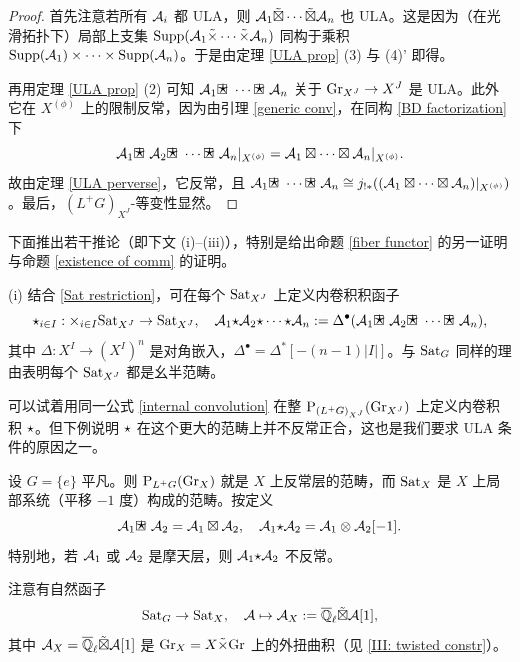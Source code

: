 \begin{proof}
首先注意若所有 ${\mathcal A}_i$ 都 ULA，则 ${\mathcal A}_1\tilde\boxtimes\cdots\tilde\boxtimes{\mathcal A}_n$ 也 ULA。这是因为（在光滑拓扑下）局部上支集 $\operatorname{Supp}({\mathcal A}_1\tilde\times\cdots\tilde\times{\mathcal A}_n)$ 同构于乘积 $\operatorname{Supp}({\mathcal A}_1)\times\cdots\times\operatorname{Supp}({\mathcal A}_n)$。于是由定理 \ref{ULA prop} (3) 与 (4)' 即得。

再用定理 \ref{ULA prop} (2) 可知 $\mA_1\boxstar\cdots\boxstar\mA_n$ 关于 ${\operatorname{Gr}}_{X^J}\to X^J$ 是 ULA。此外它在 $X^{(\phi)}$ 上的限制反常，因为由引理 \ref{generic conv}，在同构 \eqref{BD factorization} 下
\[\mA_1\boxstar \mA_2\boxstar \cdots\boxstar \mA_n|_{X^{(\phi)}}=\mA_1\boxtimes\cdots\boxtimes\mA_n|_{X^{(\phi)}}.\]
故由定理 \ref{ULA perverse}，它反常，且 $\mA_1\boxstar\cdots\boxstar\mA_n\cong j_{!*}((\mA_1\boxtimes\cdots\boxtimes\mA_n)|_{X^{(\phi)}})$。最后，$(L^+G)_{X^J}$-等变性显然。
\end{proof}

下面推出若干推论（即下文 (i)--(iii)），特别是给出命题 \ref{fiber functor} 的另一证明与命题 \ref{existence of comm} 的证明。

(i) 结合 \eqref{Sat restriction}，可在每个 ${\operatorname{Sat}}_{X^J}$ 上定义内卷积积函子
\begin{equation}\label{internal convolution}
\ostar_{i\in I}: \times_{i\in I}\Sat_{X^J}\to \Sat_{X^J},\quad \mA_1\ostar\mA_2\ostar\cdots\ostar\mA_n:= \Delta^\bullet(\mA_1\boxstar\mA_2\boxstar\cdots\boxstar\mA_n),
\end{equation}
其中 $\Delta: X^I\to (X^I)^n$ 是对角嵌入，$\Delta^\bullet=\Delta^*[-(n-1)|I|]$。与 ${\operatorname{Sat}}_G$ 同样的理由表明每个 ${\operatorname{Sat}}_{X^J}$ 都是幺半范畴。

\begin{rmk}\label{triv group}
可以试着用同一公式 \eqref{internal convolution} 在整 $\operatorname{P}_{(L^+G)_{X^J}}({\operatorname{Gr}}_{X^J})$ 上定义内卷积积 $\text{$\star$}$。但下例说明 $\text{$\star$}$ 在这个更大的范畴上并不反常正合，这也是我们要求 ULA 条件的原因之一。

设 $G=\{e\}$ 平凡。则 $\operatorname{P}_{L^+G}({\operatorname{Gr}}_X)$ 就是 $X$ 上反常层的范畴，而 ${\operatorname{Sat}}_X$ 是 $X$ 上局部系统（平移 $-1$ 度）构成的范畴。按定义
\[\mA_1\boxstar\mA_2=\mA_1\boxtimes\mA_2,\quad \mA_1\ostar\mA_2=\mA_1\otimes\mA_2[-1].\]
特别地，若 ${\mathcal A}_1$ 或 ${\mathcal A}_2$ 是摩天层，则 ${\mathcal A}_1\text{$\star$}{\mathcal A}_2$ 不反常。
\end{rmk}

注意有自然函子
\[{\operatorname{Sat}}_G\to {\operatorname{Sat}}_X,\quad {\mathcal A}\mapsto {\mathcal A}_X:={\overline{{\mathbb Q}}_\ell}\tilde\boxtimes{\mathcal A}[1],\]
其中 ${\mathcal A}_X={\overline{{\mathbb Q}}_\ell}\tilde\boxtimes{\mathcal A}[1]$ 是 ${\operatorname{Gr}}_X=X\tilde\times{\operatorname{Gr}}$ 上的外扭曲积（见 \eqref{III: twisted constr}）。

